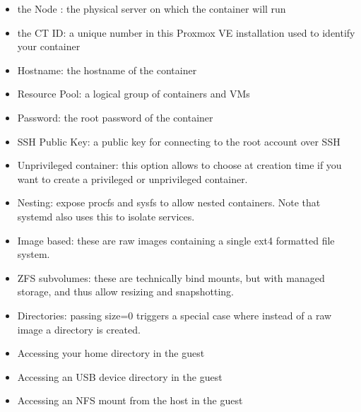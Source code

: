 \begin{itemize}[leftmargin=2cm]

	\item the Node : the physical server on which the container will run

	\item the CT ID: a unique number in this Proxmox VE installation used to identify your container

	\item Hostname: the hostname of the container

	\item Resource Pool: a logical group of containers and VMs

	\item Password: the root password of the container

	\item SSH Public Key: a public key for connecting to the root account over SSH

	\item Unprivileged container: this option allows to choose at creation time if you want to create a privileged or unprivileged container.

	\item Nesting: expose procfs and sysfs to allow nested containers. Note that systemd also uses this to isolate services.

\end{itemize}

\begin{itemize}[leftmargin=2cm]

	\item Image based: these are raw images containing a single ext4 formatted file system.

	\item ZFS subvolumes: these are technically bind mounts, but with managed storage, and thus allow resizing and snapshotting.

	\item Directories: passing size=0 triggers a special case where instead of a raw image a directory is created.

\end{itemize}

\begin{itemize}[leftmargin=2cm]

	\item Accessing your home directory in the guest

	\item Accessing an USB device directory in the guest

	\item Accessing an NFS mount from the host in the guest

\end{itemize}

